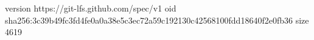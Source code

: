 version https://git-lfs.github.com/spec/v1
oid sha256:3c39b49fc3fd4fe0a0a38e5c3ec72a59c192130c42568100fdd18640f2e0fb36
size 4619
